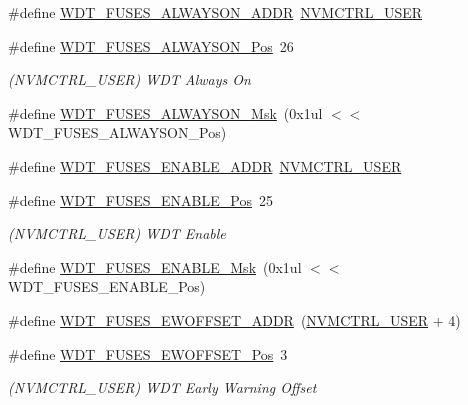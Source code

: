 \begin{DoxyCompactItemize}
\item 
\#define \mbox{\hyperlink{group__fuses__api_ga3eb73a36a8769a4f7e0dfdac5e488351}{W\+D\+T\+\_\+\+F\+U\+S\+E\+S\+\_\+\+A\+L\+W\+A\+Y\+S\+O\+N\+\_\+\+A\+D\+DR}}~\mbox{\hyperlink{group___s_a_m_d21_j18_a__base_ga7a7a83a5753fa323b61536e396083c99}{N\+V\+M\+C\+T\+R\+L\+\_\+\+U\+S\+ER}}
\item 
\#define \mbox{\hyperlink{group__fuses__api_gaad4f4fec9a3339faea07db386174b75e}{W\+D\+T\+\_\+\+F\+U\+S\+E\+S\+\_\+\+A\+L\+W\+A\+Y\+S\+O\+N\+\_\+\+Pos}}~26
\begin{DoxyCompactList}\small\item\em (N\+V\+M\+C\+T\+R\+L\+\_\+\+U\+S\+ER) W\+DT Always On \end{DoxyCompactList}\item 
\#define \mbox{\hyperlink{group__fuses__api_ga05c6f0eb24d3052a4741e4ac15f4eba7}{W\+D\+T\+\_\+\+F\+U\+S\+E\+S\+\_\+\+A\+L\+W\+A\+Y\+S\+O\+N\+\_\+\+Msk}}~(0x1ul $<$$<$ W\+D\+T\+\_\+\+F\+U\+S\+E\+S\+\_\+\+A\+L\+W\+A\+Y\+S\+O\+N\+\_\+\+Pos)
\item 
\#define \mbox{\hyperlink{group__fuses__api_gae27b2582fb347f81b42d4722e93c19eb}{W\+D\+T\+\_\+\+F\+U\+S\+E\+S\+\_\+\+E\+N\+A\+B\+L\+E\+\_\+\+A\+D\+DR}}~\mbox{\hyperlink{group___s_a_m_d21_j18_a__base_ga7a7a83a5753fa323b61536e396083c99}{N\+V\+M\+C\+T\+R\+L\+\_\+\+U\+S\+ER}}
\item 
\#define \mbox{\hyperlink{group__fuses__api_ga3e49258fa52a7aededcc7b3e54533ef5}{W\+D\+T\+\_\+\+F\+U\+S\+E\+S\+\_\+\+E\+N\+A\+B\+L\+E\+\_\+\+Pos}}~25
\begin{DoxyCompactList}\small\item\em (N\+V\+M\+C\+T\+R\+L\+\_\+\+U\+S\+ER) W\+DT Enable \end{DoxyCompactList}\item 
\#define \mbox{\hyperlink{group__fuses__api_ga7321a6dde7b33a36af18c07c65c6a55e}{W\+D\+T\+\_\+\+F\+U\+S\+E\+S\+\_\+\+E\+N\+A\+B\+L\+E\+\_\+\+Msk}}~(0x1ul $<$$<$ W\+D\+T\+\_\+\+F\+U\+S\+E\+S\+\_\+\+E\+N\+A\+B\+L\+E\+\_\+\+Pos)
\item 
\#define \mbox{\hyperlink{group__fuses__api_ga04fb0607afaf725d76bd4205ea0d4f94}{W\+D\+T\+\_\+\+F\+U\+S\+E\+S\+\_\+\+E\+W\+O\+F\+F\+S\+E\+T\+\_\+\+A\+D\+DR}}~(\mbox{\hyperlink{group___s_a_m_d21_j18_a__base_ga7a7a83a5753fa323b61536e396083c99}{N\+V\+M\+C\+T\+R\+L\+\_\+\+U\+S\+ER}} + 4)
\item 
\#define \mbox{\hyperlink{group__fuses__api_gae2f89f15eabc293811402651af74d059}{W\+D\+T\+\_\+\+F\+U\+S\+E\+S\+\_\+\+E\+W\+O\+F\+F\+S\+E\+T\+\_\+\+Pos}}~3
\begin{DoxyCompactList}\small\item\em (N\+V\+M\+C\+T\+R\+L\+\_\+\+U\+S\+ER) W\+DT Early Warning Offset \end{DoxyCompactList}\item 

\end{DoxyCompactItemize}

